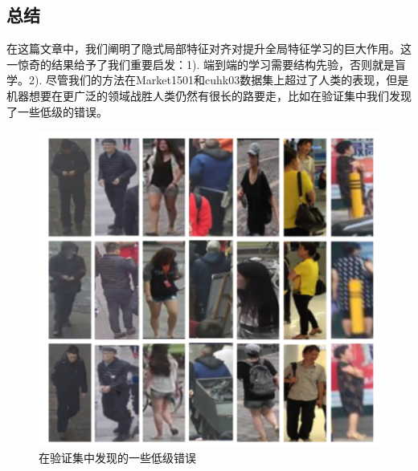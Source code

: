 \subsection{总结}
在这篇文章中，我们阐明了隐式局部特征对齐对提升全局特征学习的巨大作用。这一惊奇的结果给予了我们重要启发：1). 端到端的学习需要结构先验，否则就是盲学。2). 尽管我们的方法在Market1501和cuhk03数据集上超过了人类的表现，但是机器想要在更广泛的领域战胜人类仍然有很长的路要走，比如在验证集中我们发现了一些低级的错误。

\begin{figure}[!htbp]
  \centering
  \includegraphics[width=.4\linewidth,keepaspectratio]{data/waiwenfanyi/bad.png}
  \caption{在验证集中发现的一些低级错误}
  \label{figure:bad}
\end{figure}
